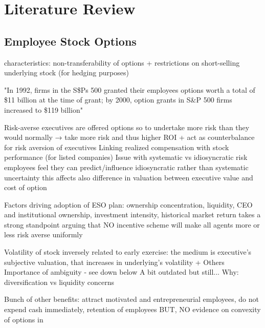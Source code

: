 \section{Literature Review}

\subsection{Employee Stock Options} %

    characteristics: non-transferability of options + restrictions on short-selling underlying stock (for hedging purposes)

    "In 1992, firms in the S\$Ps 500 granted their employees options worth a total of \$11 billion at the time of grant; by 2000, option grants in S\&P 500 firms increased to \$119 billion" \cite{hall2003trouble}

    Risk-averse executives are offered options so to undertake more risk than they would normally → take more risk and thus higher ROI + act as counterbalance for risk aversion of executives
    Linking realized compensation with stock performance (for listed companies)
    Issue with systematic vs idiosyncratic risk  \cite{armstrong2012executive} \cite{heron2017stock}
        employees feel they can predict/influence idiosyncratic rather than systematic uncertainty
        this affects also difference in valuation between executive value and cost of option \cite{meulbroek2001efficiency}

    Factors driving adoption of ESO plan: ownership concentration, liquidity, CEO and institutional ownership, investment intensity, historical market return \cite{pasternack2002factors}
    \cite{ross2004compensation} takes a strong standpoint arguing that NO incentive scheme will make all agents more or less risk averse uniformly


    Volatility of stock inversely related to early exercise: the medium is executive's subjective valuation, that increases in underlying's volatility \cite{heron2017stock} \cite{izhakian2017risk} + Others
    Importance of ambiguity - see down below 
    A bit outdated but still... \cite{huddart1996employee}
    Why: diversification vs liquidity concerns \cite{murphy2019employees}


    Bunch of other benefits: attract motivated and entrepreneurial employees, do not expend cash immediately, retention of employees  \cite{hall2003trouble}
    BUT, NO evidence on convexity of options in \cite{hayes2012stock}

